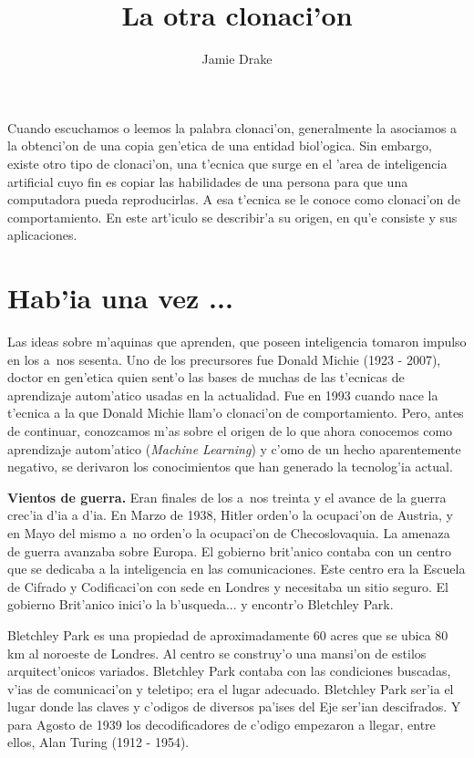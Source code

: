 \documentclass[11pt]{article}
\begin{document}
\title{La otra clonaci'on}
\author{Jamie Drake}

\maketitle
Cuando escuchamos o leemos la palabra clonaci'on, generalmente la asociamos a la obtenci'on de una copia gen'etica de una entidad biol'ogica. Sin embargo, existe otro tipo de clonaci'on, una t'ecnica que surge en el 'area de inteligencia artificial cuyo fin es copiar las habilidades de una persona para que una computadora pueda reproducirlas. A esa t'ecnica se le conoce como clonaci'on de comportamiento. En este art'iculo se describir'a su origen, en qu'e consiste y sus aplicaciones.


\section{Hab'ia una vez ...}
Las ideas sobre m'aquinas que aprenden, que poseen inteligencia tomaron impulso en los a~nos sesenta. Uno de los precursores fue Donald Michie (1923 - 2007), doctor en gen'etica quien sent'o las bases de muchas de las t'ecnicas de aprendizaje autom'atico usadas en la actualidad. Fue en 1993 cuando nace la t'ecnica a la que Donald Michie llam'o clonaci'on de comportamiento. Pero, antes de continuar, conozcamos m'as sobre el origen de lo que ahora conocemos como aprendizaje autom'atico (\textit{Machine Learning}) y c'omo de un hecho aparentemente negativo, se derivaron los conocimientos que han generado la tecnolog'ia actual.


\medskip
\textbf{Vientos de guerra.} Eran finales de los a~nos treinta y el avance de la guerra crec'ia d'ia a d'ia. En Marzo de 1938, Hitler orden'o la ocupaci'on de Austria, y en Mayo del mismo a~no orden'o la ocupaci'on de Checoslovaquia. La amenaza de guerra avanzaba sobre Europa. El gobierno brit'anico contaba con un centro que se dedicaba a la inteligencia en las comunicaciones. Este centro era la Escuela de Cifrado y Codificaci'on con sede en Londres y necesitaba un sitio seguro. El gobierno Brit'anico inici'o la b'usqueda... y encontr'o Bletchley Park.

Bletchley Park es una propiedad de aproximadamente 60 acres que se ubica 80 km al noroeste de Londres. Al centro se construy'o una mansi'on de estilos arquitect'onicos variados. Bletchley Park contaba con las condiciones buscadas, v'ias de comunicaci'on y teletipo; era el lugar adecuado. Bletchley Park ser'ia el lugar donde las claves y c'odigos de diversos pa'ises del Eje ser'ian descifrados. Y para Agosto de 1939 los decodificadores de c'odigo empezaron a llegar, entre ellos, Alan Turing (1912 - 1954). 
\end{document}

